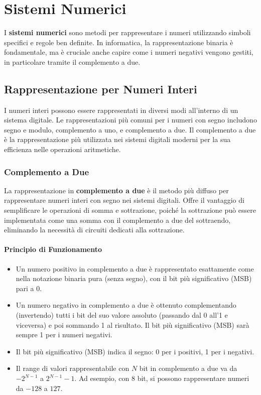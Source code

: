\chapter{Sistemi Numerici}

I \textbf{sistemi numerici} sono metodi per rappresentare i numeri utilizzando simboli specifici e regole ben definite. In informatica, la rappresentazione binaria è fondamentale, ma è cruciale anche capire come i numeri negativi vengono gestiti, in particolare tramite il complemento a due.

\section{Rappresentazione per Numeri Interi}
I numeri interi possono essere rappresentati in diversi modi all'interno di un sistema digitale. Le rappresentazioni più comuni per i numeri con segno includono segno e modulo, complemento a uno, e complemento a due. Il complemento a due è la rappresentazione più utilizzata nei sistemi digitali moderni per la sua efficienza nelle operazioni aritmetiche.

\subsection{Complemento a Due}
La rappresentazione in \textbf{complemento a due} è il metodo più diffuso per rappresentare numeri interi con segno nei sistemi digitali. Offre il vantaggio di semplificare le operazioni di somma e sottrazione, poiché la sottrazione può essere implementata come una somma con il complemento a due del sottraendo, eliminando la necessità di circuiti dedicati alla sottrazione.

\subsubsection{Principio di Funzionamento}
\begin{itemize}
    \item Un numero positivo in complemento a due è rappresentato esattamente come nella notazione binaria pura (senza segno), con il bit più significativo (MSB) pari a 0.
    \item Un numero negativo in complemento a due è ottenuto complementando (invertendo) tutti i bit del suo valore assoluto (passando dal 0 all'1 e viceversa) e poi sommando 1 al risultato. Il bit più significativo (MSB) sarà sempre 1 per i numeri negativi.
    \item Il bit più significativo (MSB) indica il segno: 0 per i positivi, 1 per i negativi.
    \item Il range di valori rappresentabile con $N$ bit in complemento a due va da $-2^{N-1}$ a $2^{N-1}-1$. Ad esempio, con 8 bit, si possono rappresentare numeri da $-128$ a $127$.
\end{itemize}


